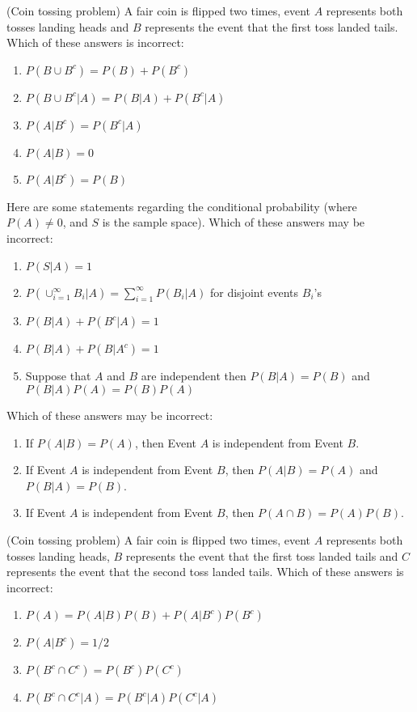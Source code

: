 \documentclass[poll_tutorial_format]{subfiles}
\begin{document}
\begin{exercise}
	(Coin tossing problem) A fair coin is flipped two times, event $A$ represents both tosses landing heads and $B$ represents the event that the first toss landed tails. 
	Which of these answers is incorrect: 
	\begin{enumerate}
		\item $P(B\cup B^c )=P(B)+P(B^c)$
		\item $P(B\cup B^c |A)=P(B|A)+P(B^c|A)$
		\item $P(A|B^c)=P(B^c|A)$
		\item $P(A|B)=0$
		\item $P(A|B^c)=P(B)$
	\end{enumerate}
\end{exercise}


\begin{exercise}
	Here are some statements regarding the conditional probability (where $P(A)\neq 0$, and $S$ is the sample space).
	Which of these answers may be incorrect: 
	\begin{enumerate}
		\item $P(S|A)=1$
		\item $P(\cup_{i=1}^\infty B_i|A) = \sum_{i=1}^\infty P(B_i|A)$ for disjoint events $B_i$'s
		\item $P(B|A)+P(B^c|A)=1$
		\item $P(B|A)+P(B|A^c)=1$ 
		\item Suppose that $A$ and $B$ are independent then $P(B|A)=P(B)$ and $P(B|A)P(A)=P(B)P(A)$ 
	\end{enumerate}
\end{exercise}


\begin{exercise}
	Which of these answers may be incorrect: 
	\begin{enumerate}
		\item If $P(A|B)=P(A)$, then Event $A$ is independent from Event $B$.
		\item If Event $A$ is independent from Event $B$, then $P(A|B)=P(A)$ and $P(B|A)=P(B)$.
		\item If Event $A$ is independent from Event $B$, then $P(A\cap B)=P(A)P(B)$.
	\end{enumerate}
\end{exercise}


\begin{exercise}
	(Coin tossing problem) A fair coin is flipped two times, event $A$ represents both tosses landing heads, $B$ represents the event that the first toss landed tails and $C$ represents the event that the second toss landed tails. 
Which of these answers is incorrect: 
\begin{enumerate}
		\item $P(A)=P(A|B)P(B)+P(A|B^c)P(B^c)$ 
		\item $P(A|B^c)=1/2$
		\item $P(B^c\cap C^c)=P(B^c)P(C^c)$ 
		\item $P(B^c\cap C^c|A)=P(B^c|A)P(C^c|A) $  
	\end{enumerate}
\end{exercise}
\end{document}
